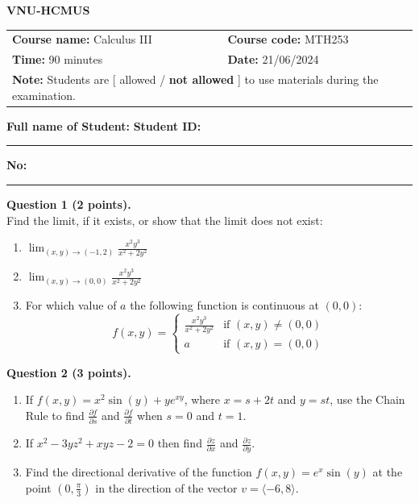 \documentclass[11pt]{article}
\begin{document}
\begin{center}
    \textbf{\Large VNU-HCMUS}
\end{center}

\vspace{0.5cm}

\begin{table}[h!]
\centering
\begin{tabularx}{\textwidth}{|X|X|}
\hline
\textbf{Course name:} Calculus III & \textbf{Course code:} MTH253 \\
\textbf{Time:} 90 minutes & \textbf{Date:} 21/06/2024 \\
\hline
\multicolumn{2}{|l|}{\textbf{Note:} Students are [ allowed / \textbf{not allowed} ] to use materials during the examination.} \\
\hline
\end{tabularx}
\end{table}

\noindent \textbf{Full name of Student:} \hrulefill \quad \textbf{Student ID:} \rule{3cm}{0.4pt} \quad \textbf{No:} \rule{1.5cm}{0.4pt}

\vspace{0.5cm}

\noindent \textbf{Question 1 (2 points).} \\
Find the limit, if it exists, or show that the limit does not exist:
\begin{enumerate}
    \item[a)] $\lim_{(x,y)\to(-1,2)} \frac{x^2y^3}{x^2+2y^2}$
    \item[b)] $\lim_{(x,y)\to(0,0)} \frac{x^2y^3}{x^2+2y^2}$
    \item[c)] For which value of $a$ the following function is continuous at $(0,0)$:
    \[
    f(x,y) = \begin{cases} 
    \frac{x^2y^3}{x^2+2y^2} & \text{if } (x,y) \neq (0,0) \\ 
    a & \text{if } (x,y) = (0,0) 
    \end{cases}
    \]
\end{enumerate}

\noindent \textbf{Question 2 (3 points).}
\begin{enumerate}
    \item[a)] If $f(x,y)=x^2\sin(y)+ye^{xy}$, where $x=s+2t$ and $y=st$, use the Chain Rule to find $\frac{\partial f}{\partial s}$ and $\frac{\partial f}{\partial t}$ when $s=0$ and $t=1$.
    \item[b)] If $x^2-3yz^2+xyz-2=0$ then find $\frac{\partial z}{\partial x}$ and $\frac{\partial z}{\partial y}$.
    \item[c)] Find the directional derivative of the function $f(x,y)=e^x\sin(y)$ at the point $(0,\frac{\pi}{3})$ in the direction of the vector $v=\langle-6,8\rangle$.
\end{enumerate}
\end{document}
